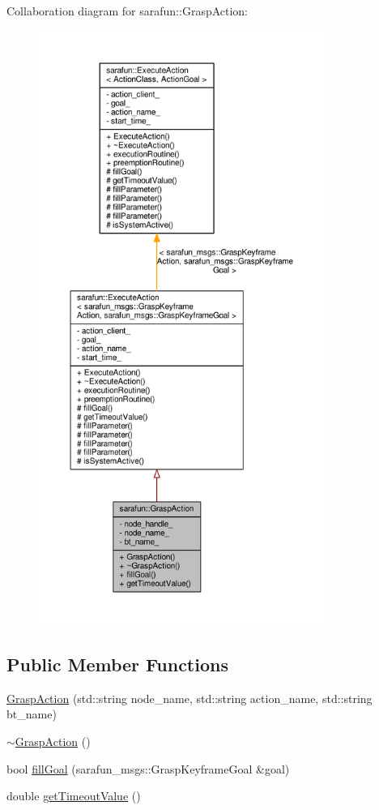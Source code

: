 Collaboration diagram for sarafun\-:\-:Grasp\-Action\-:
\nopagebreak
\begin{figure}[H]
\begin{center}
\leavevmode
\includegraphics[height=550pt]{d0/dab/classsarafun_1_1GraspAction__coll__graph}
\end{center}
\end{figure}
\subsection*{Public Member Functions}
\begin{DoxyCompactItemize}
\item 
\hyperlink{classsarafun_1_1GraspAction_ae3eed6fe11388023bab8316803759ac5_ae3eed6fe11388023bab8316803759ac5}{Grasp\-Action} (std\-::string node\-\_\-name, std\-::string action\-\_\-name, std\-::string bt\-\_\-name)
\item 
\hyperlink{classsarafun_1_1GraspAction_aeb09ce6ab575e2653bfb88aa62b09361_aeb09ce6ab575e2653bfb88aa62b09361}{$\sim$\-Grasp\-Action} ()
\item 
bool \hyperlink{classsarafun_1_1GraspAction_a7418fe9de5024a8fbbfe8e5f5336d66f_a7418fe9de5024a8fbbfe8e5f5336d66f}{fill\-Goal} (sarafun\-\_\-msgs\-::\-Grasp\-Keyframe\-Goal \&goal)
\item 
double \hyperlink{classsarafun_1_1GraspAction_a406d5c86b5f788537c5af9d125724a55_a406d5c86b5f788537c5af9d125724a55}{get\-Timeout\-Value} ()
\end{DoxyCompactItemize}
